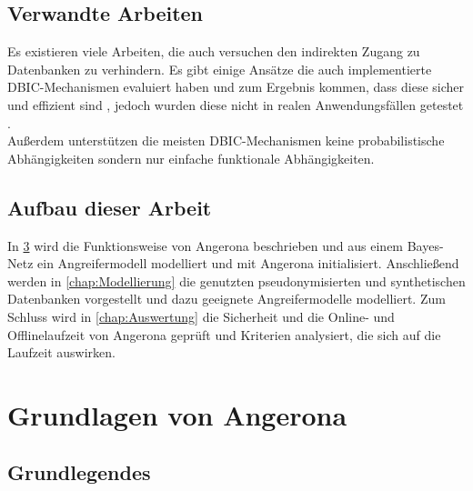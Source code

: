 \documentclass[german,version-2020-11]{uzl-thesis}
\begin{document}
\section{Verwandte Arbeiten}
Es existieren viele Arbeiten, die auch versuchen den indirekten Zugang zu Datenbanken zu verhindern. Es gibt einige Ansätze die auch implementierte DBIC-Mechanismen evaluiert haben und zum Ergebnis kommen, dass diese sicher und effizient sind , jedoch wurden diese nicht in realen Anwendungsfällen getestet \cite{24}. \\ 
Außerdem unterstützen die meisten DBIC-Mechanismen keine probabilistische Abhängigkeiten sondern nur einfache funktionale Abhängigkeiten. 

\section{Aufbau dieser Arbeit}
In \cref{chap:Grundlagen} wird die Funktionsweise von Angerona beschrieben und aus einem Bayes-Netz ein Angreifermodell modelliert und mit Angerona initialisiert. Anschließend werden in  \cref{chap:Modellierung} die genutzten pseudonymisierten und synthetischen Datenbanken vorgestellt und dazu geeignete Angreifermodelle modelliert. Zum Schluss wird in \cref{chap:Auswertung} die Sicherheit und die Online- und Offlinelaufzeit von Angerona geprüft und Kriterien analysiert, die sich auf die Laufzeit auswirken.

\chapter{Grundlagen von Angerona}\label{chap:Grundlagen}
\section{Grundlegendes}
\end{document}
